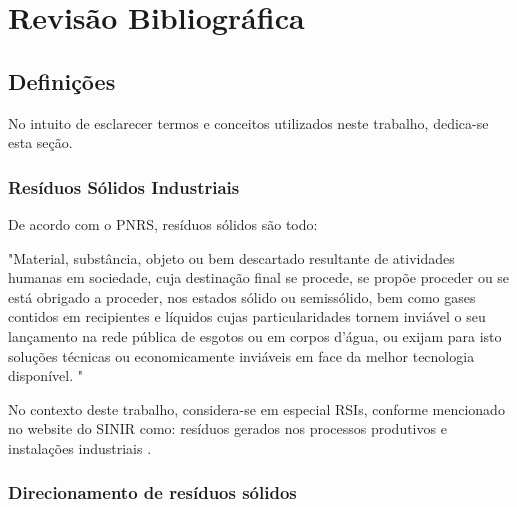 \chapter{Revisão Bibliográfica}\label{cap:revisaobibliografica}

\section{Definições}

No intuito de esclarecer termos e conceitos utilizados neste trabalho, dedica-se esta seção.

\subsection{Resíduos Sólidos Industriais}

De acordo com o \gls{PNRS}, resíduos sólidos são todo:

\begin{citacao}
	"Material, substância, objeto ou bem descartado resultante de atividades humanas em sociedade, cuja destinação final se procede, se propõe proceder ou se está obrigado a proceder, nos estados sólido ou semissólido, bem como gases contidos em recipientes e líquidos cujas particularidades tornem inviável o seu lançamento na rede pública de esgotos ou em corpos d’água, ou exijam para isto soluções técnicas ou economicamente inviáveis em face da melhor tecnologia disponível. \cite[Art. 3º, ítem XVI]{brasil_lei_nodate}"		
\end{citacao}

No contexto deste trabalho, considera-se em especial \gls{RSI}s, conforme mencionado no website do \gls{SINIR} como: resíduos gerados nos processos produtivos e instalações industriais \cite{sinir_sinir_nodate}.

\subsection{Direcionamento de resíduos sólidos}

